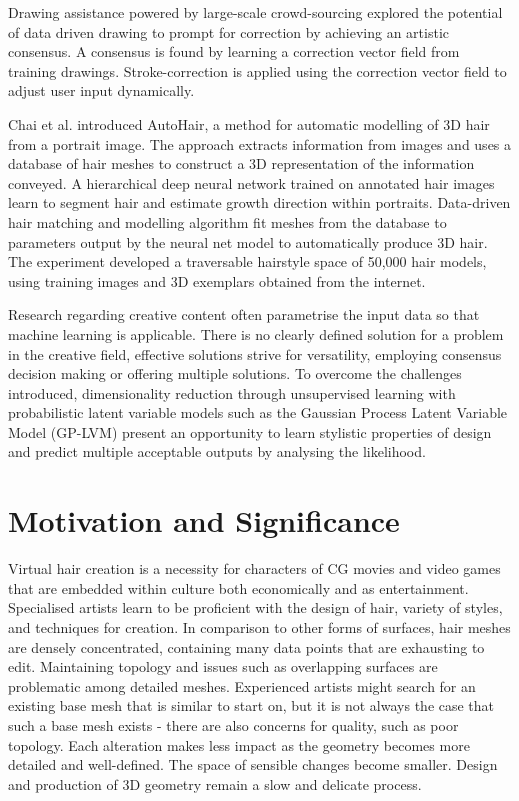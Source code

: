 \documentclass[ %
author={Dillon Keith Diep},
supervisor={Dr. Carl Henrik Ek},
degree={MEng},
title={ART-CG:},
subtitle={Assisted Real-time Content Generation of 3D Hair by Learning Manifolds},
type={Research},
year={2017} ]{dissertation}
\begin{document}
Drawing assistance powered by large-scale crowd-sourcing explored the potential of data driven drawing to prompt for correction by achieving an artistic consensus. \cite{drawingassistance} A consensus is found by learning a correction vector field from training drawings. Stroke-correction is applied using the correction vector field to adjust user input dynamically.

Chai et al. introduced AutoHair, a method for automatic modelling of 3D hair from a portrait image. \cite{autohair} The approach extracts information from images and uses a database of hair meshes to construct a 3D representation of the information conveyed. A hierarchical deep neural network trained on annotated hair images learn to segment hair and estimate growth direction within portraits. Data-driven hair matching and modelling algorithm fit meshes from the database to parameters output by the neural net model to automatically produce 3D hair. The experiment developed a traversable hairstyle space of 50,000 hair models, using training images and 3D exemplars obtained from the internet.

Research regarding creative content often parametrise the input data so that machine learning is applicable. There is no clearly defined solution for a problem in the creative field, effective solutions strive for versatility, employing consensus decision making or offering multiple solutions. To overcome the challenges introduced, dimensionality reduction through unsupervised learning with probabilistic latent variable models such as the Gaussian Process Latent Variable Model (GP-LVM) \cite{gplvm} present an opportunity to learn stylistic properties of design and predict multiple acceptable outputs by analysing the likelihood.

\section{Motivation and Significance}
Virtual hair creation is a necessity for characters of CG movies and video games that are embedded within culture both economically and as entertainment. Specialised artists learn to be proficient with the design of hair, variety of styles, and techniques for creation. In comparison to other forms of surfaces, hair meshes are densely concentrated, containing many data points that are exhausting to edit. Maintaining topology and issues such as overlapping surfaces are problematic among detailed meshes. Experienced artists might search for an existing base mesh that is similar to start on, but it is not always the case that such a base mesh exists - there are also concerns for quality, such as poor topology. Each alteration makes less impact as the geometry becomes more detailed and well-defined. The space of sensible changes become smaller. Design and production of 3D geometry remain a slow and delicate process.
\end{document}
